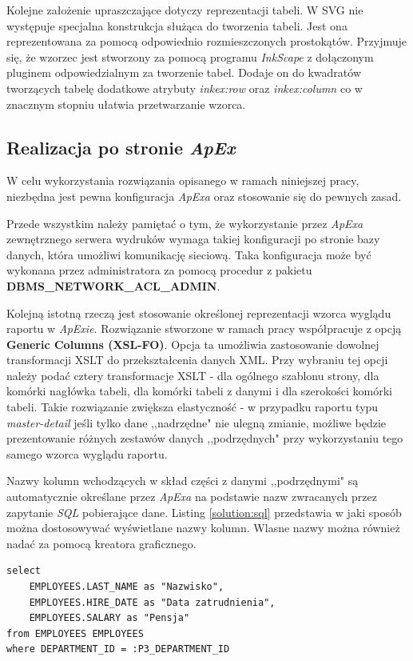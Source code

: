 \documentclass[11pt,a4paper]{article}
\begin{document}
Kolejne założenie upraszczające dotyczy reprezentacji tabeli. W SVG nie występuje specjalna konstrukcja służąca do tworzenia tabeli. Jest ona reprezentowana za pomocą odpowiednio rozmieszczonych prostokątów. Przyjmuje się, że wzorzec jest stworzony za pomocą programu \emph{InkScape} z dołączonym pluginem odpowiedzialnym za tworzenie tabel. Dodaje on do kwadratów tworzących tabelę dodatkowe atrybuty \emph{inkex:row} oraz \emph{inkex:column} co w znacznym stopniu ułatwia przetwarzanie wzorca.

\subsection{Realizacja po stronie \emph{ApEx}} \label{solution:realization}
W celu wykorzystania rozwiązania opisanego w ramach niniejszej pracy, niezbędna jest pewna konfiguracja \emph{ApExa} oraz stosowanie się do pewnych zasad.

Przede wszystkim należy pamiętać o tym, że wykorzystanie przez \emph{ApExa} zewnętrznego serwera wydruków wymaga takiej konfiguracji po stronie bazy danych, która umożliwi komunikację sieciową. Taka konfiguracja może być wykonana przez administratora za pomocą procedur z pakietu \textbf{DBMS\_NETWORK\_ACL\_ADMIN}.

Kolejną istotną rzeczą jest stosowanie określonej reprezentacji wzorca wyglądu raportu w \emph{ApExie}. Rozwiązanie stworzone w ramach pracy współpracuje z opcją \textbf{Generic Columns (XSL-FO)}. Opcja ta umożliwia zastosowanie dowolnej transformacji XSLT do przekształcenia danych XML. Przy wybraniu tej opcji należy podać cztery transformacje XSLT - dla ogólnego szablonu strony, dla komórki nagłówka tabeli, dla komórki tabeli z danymi i dla szerokości komórki tabeli.
Takie rozwiązanie zwiększa elastyczność - w przypadku raportu typu \emph{master-detail} jeśli tylko dane ,,nadrzędne" nie ulegną zmianie, możliwe będzie prezentowanie różnych zestawów danych ,,podrzędnych" przy wykorzystaniu tego samego wzorca wyglądu raportu. 

Nazwy kolumn wchodzących w skład części z danymi ,,podrzędnymi" są automatycznie określane przez \emph{ApExa} na podstawie nazw zwracanych przez zapytanie \emph{SQL} pobierające dane. Listing \ref{solution:sql} przedstawia w jaki sposób można dostosowywać wyświetlane nazwy kolumn. Wlasne nazwy można również nadać za pomocą kreatora graficznego.
 
\lstset{language=SQL}
\begin{lstlisting}[frame=single,caption=Przykładowe zapytanie \emph{SQL},label=solution:sql]
select
    EMPLOYEES.LAST_NAME as "Nazwisko",
    EMPLOYEES.HIRE_DATE as "Data zatrudnienia",
    EMPLOYEES.SALARY as "Pensja"
from EMPLOYEES EMPLOYEES
where DEPARTMENT_ID = :P3_DEPARTMENT_ID
\end{lstlisting}
\end{document}
